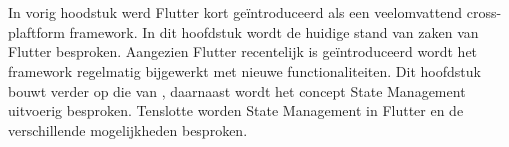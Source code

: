 \chapter{}
\label{ch:stand-van-zaken}

\newcommand\figureWidthModifier{0.6}



%
%

In vorig hoodstuk werd Flutter kort geïntroduceerd als een veelomvattend cross-plaftform framework. In dit hoofdstuk wordt de huidige stand van zaken van Flutter besproken. Aangezien Flutter recentelijk is geïntroduceerd wordt het framework regelmatig bijgewerkt met nieuwe functionaliteiten. Dit hoofdstuk bouwt verder op die van \autocite{Coninck2019}, daarnaast wordt het concept State Management uitvoerig besproken. Tenslotte worden State Management in Flutter en de verschillende mogelijkheden besproken. 
\newline

